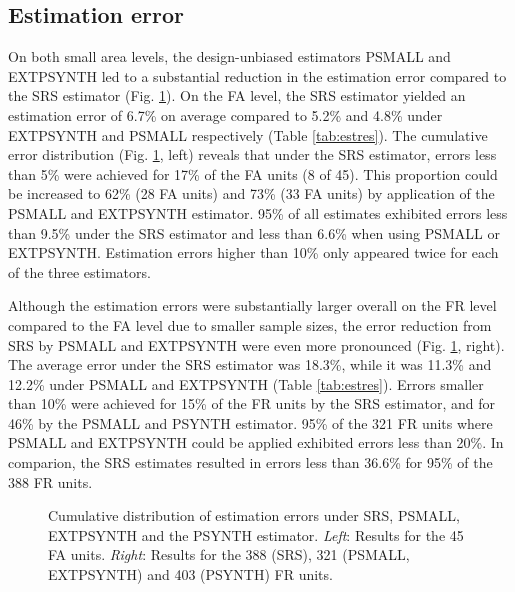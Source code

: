 \documentclass[remotesensing,article,submit,moreauthors,pdftex,10pt,a4paper]{mdpi}
\newcommand{\psynth}{PSYNTH}
\newcommand{\psmall}{PSMALL}
\newcommand{\extpsynth}{EXTPSYNTH}
\begin{document}
\subsection{Estimation error}
\label{sec:esterr}

On both small area levels, the design-unbiased estimators \psmall{} and \extpsynth{} led to a substantial reduction in the estimation error compared to the SRS estimator (Fig. \ref{fig:disterrors}). On the FA level, the SRS estimator yielded an estimation error of 6.7\% on average compared to 5.2\% and 4.8\% under \extpsynth{} and \psmall{} respectively (Table \ref{tab:estres}). The cumulative error distribution (Fig. \ref{fig:disterrors}, left) reveals that under the SRS estimator, errors less than 5\% were achieved for 17\% of the FA units (8 of 45). This proportion could be increased to 62\% (28 FA units) and 73\% (33 FA units) by application of the \psmall{} and \extpsynth{} estimator. 95\% of all estimates exhibited errors less than 9.5\% under the SRS estimator and less than 6.6\% when using \psmall{} or \extpsynth{}. Estimation errors higher than 10\% only appeared twice for each of the three estimators.\par
Although the estimation errors were substantially larger overall on the FR level compared to the FA level due to smaller sample sizes, the error reduction from SRS by \psmall{} and \extpsynth{} were even more pronounced (Fig. \ref{fig:disterrors}, right). The average error under the SRS estimator was 18.3\%, while it was 11.3\% and 12.2\% under \psmall{} and \extpsynth{} (Table \ref{tab:estres}). Errors smaller than 10\% were achieved for 15\% of the FR units by the SRS estimator, and for 46\% by the \psmall{} and \psynth{} estimator. 95\% of the 321 FR units where \psmall{} and \extpsynth{} could be applied exhibited errors less than 20\%. In comparion, the SRS estimates resulted in errors less than 36.6\% for 95\% of the 388 FR units.

\begin{figure}[H]
	\centering
	\caption{Cumulative distribution of estimation errors under SRS, \psmall{}, \extpsynth{} and the \psynth{} estimator. \textit{Left}: Results for the 45 FA units. \textit{Right}: Results for the 388 (SRS), 321 (\psmall{}, \extpsynth{}) and 403 (\psynth{}) FR units.}
	\label{fig:disterrors}
\end{figure}
\end{document}
